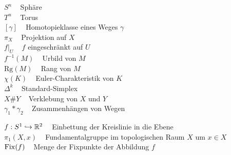 \begin{minipage}[t]{0.45\textwidth}
$S^n\;\;\;$ Sphäre\\
$T^n\;\;\;$ Torus\\

$[\gamma]\;\;\;$ Homotopieklasse eines Weges $\gamma$\\
$\pi_X\;\;\;$ Projektion auf $X$\\
$f|_U\;\;\;$ $f$ eingeschränkt auf $U$\\
$f^{-1}(M)\;\;\;$ Urbild von $M$\\
$\text{Rg}(M)\;\;\;$ Rang von $M$\\
$\chi(K)\;\;\;$ Euler-Charakteristik von $K$\\
$\Delta^k\;\;\;$ Standard-Simplex\\
$X \# Y\;\;\;$ Verklebung von $X$ und $Y$\\
$\gamma_1 * \gamma_2\;\;\;$ Zusammenhängen von Wegen\\
\end{minipage}

$f:S^1 \hookrightarrow \mathbb{R}^2\;\;\;$ Einbettung der Kreislinie in die Ebene\\
$\pi_1(X,x)\;\;\;$ Fundamentalgruppe im topologischen Raum $X$ um $x \in X$\\
$\operatorname{Fix}(f)\;\;\;$ Menge der Fixpunkte der Abbildung $f$

